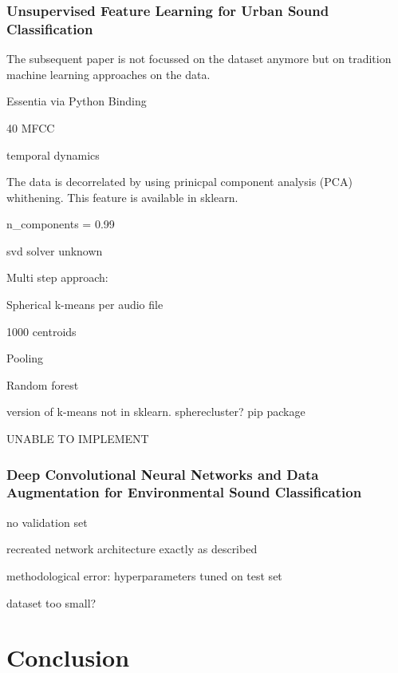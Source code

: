 \subsection{Unsupervised Feature Learning for Urban Sound Classification}
\label{7177954}

The subsequent paper \cite{7177954} is not focussed on the dataset anymore but on tradition machine learning approaches on the data. 

Essentia via Python Binding

40 MFCC

temporal dynamics

The data is decorrelated by using prinicpal component analysis (PCA) whithening. This feature is available in sklearn.

n_components = 0.99

svd solver unknown



Multi step approach:

Spherical k-means per audio file

1000 centroids

Pooling

Random forest



version of k-means not in sklearn. spherecluster? pip package

UNABLE TO IMPLEMENT


\newpage


\subsection{Deep Convolutional Neural Networks and Data
Augmentation for Environmental Sound
Classification}

no validation set


recreated network architecture exactly as described


methodological error: hyperparameters tuned on test set

dataset too small?





\chapter{Conclusion}

